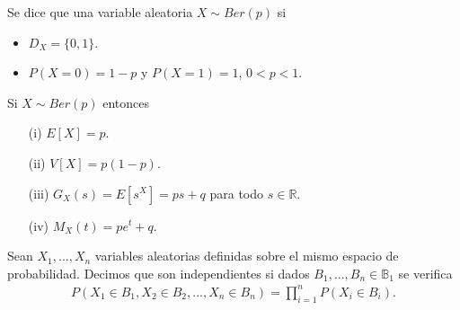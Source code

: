 \begin{defi}
    Se dice que una variable aleatoria $X \sim Ber(p)$ si
    \begin{itemize}
        \item $D_X = \{0, 1\}$.
        \item $P(X = 0) = 1 - p$ y $P(X = 1) = 1$, $0 < p < 1$.
    \end{itemize}
\end{defi}

\begin{obs}
    Si $X \sim Ber(p)$ entonces
    \begin{enumerate}
        \item[(i)] $E[X] = p$.
        \item[(ii)] $V[X] = p(1 - p)$.
        \item[(iii)] $G_X(s) = E[s^X] = ps + q$ para todo $s \in \mathbb{R}$.
        \item[(iv)] $M_X(t) = pe^t + q$.
    \end{enumerate}
\end{obs}

\begin{defi}
    Sean $X_1,...,X_n$ variables aleatorias definidas sobre el mismo espacio de probabilidad. Decimos que son independientes si dados $B_1,...,B_n \in \mathbb{B}_1$ se verifica
    \begin{align*}
        P(X_1 \in B_1, X_2 \in B_2, ..., X_n \in B_n) = \prod_{i=1}^{n}{P(X_i \in B_i)}.
    \end{align*}
\end{defi}

